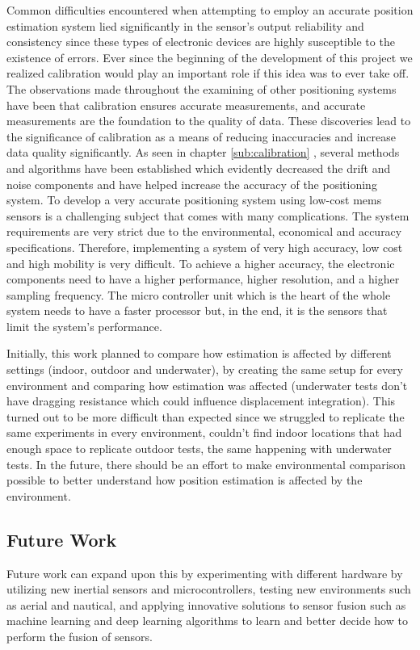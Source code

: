 Common difficulties encountered when attempting to employ an accurate position estimation system lied significantly in the sensor’s output reliability and consistency since these types of electronic devices are highly susceptible to the existence of errors. Ever since the beginning of the development of this project we realized calibration would play an important role if this idea was to ever take off. The observations made throughout the examining of other positioning systems have been that calibration ensures accurate measurements, and accurate measurements are the foundation to the quality of data. These discoveries lead to the significance of calibration as a means of reducing inaccuracies and increase data quality significantly. As seen in chapter \ref{sub:calibration} , several methods and algorithms have been established which evidently decreased the drift and noise components and have helped increase the accuracy of the positioning system. To develop a very accurate positioning system using low-cost \acrshort{mems} sensors is a challenging subject that comes with many complications. The system requirements are very strict due to the environmental, economical and accuracy specifications. Therefore, implementing a system of very high accuracy, low cost and high mobility is very difficult. To achieve a higher accuracy, the electronic components need to have a higher performance, higher resolution, and a higher sampling frequency. The micro controller unit which is the heart of the whole system needs to have a faster processor but, in the end, it is the sensors that limit the system's performance.

Initially, this work planned to compare how estimation is affected by different settings (indoor, outdoor and underwater), by creating the same setup for every environment and comparing how estimation was affected (underwater tests don't have dragging resistance which could influence displacement integration). This turned out to be more difficult than expected since we struggled to replicate the same experiments in every environment, couldn't find indoor locations that had enough space to replicate outdoor tests, the same happening with underwater tests. In the future, there should be an effort to make environmental comparison possible to better understand how position estimation is affected by the environment.

\subsection{Future Work}

Future work can expand upon this by experimenting with different hardware by utilizing new inertial sensors and microcontrollers, testing new environments such as aerial and nautical, and applying innovative solutions to sensor fusion such as machine learning and deep learning algorithms to learn and better decide how to perform the fusion of sensors.
